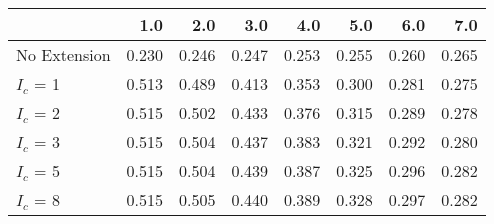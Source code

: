 \begin{tabular}{lrrrrrrr}
\toprule
{} &   1.0 &   2.0 &   3.0 &   4.0 &   5.0 &   6.0 &   7.0 \\
\midrule
No Extension & 0.230 & 0.246 & 0.247 & 0.253 & 0.255 & 0.260 & 0.265 \\
$I_c$ = 1    & 0.513 & 0.489 & 0.413 & 0.353 & 0.300 & 0.281 & 0.275 \\
$I_c$ = 2    & 0.515 & 0.502 & 0.433 & 0.376 & 0.315 & 0.289 & 0.278 \\
$I_c$ = 3    & 0.515 & 0.504 & 0.437 & 0.383 & 0.321 & 0.292 & 0.280 \\
$I_c$ = 5    & 0.515 & 0.504 & 0.439 & 0.387 & 0.325 & 0.296 & 0.282 \\
$I_c$ = 8    & 0.515 & 0.505 & 0.440 & 0.389 & 0.328 & 0.297 & 0.282 \\
\bottomrule
\end{tabular}

